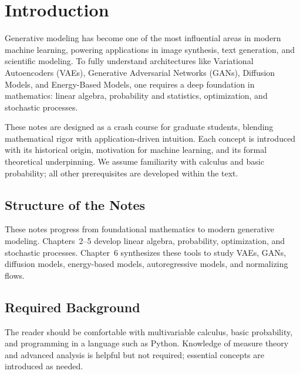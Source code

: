 \chapter{Introduction}\label{sec:intro}
Generative modeling has become one of the most influential areas in modern machine learning, powering applications in image synthesis, text generation, and scientific modeling. To fully understand architectures like Variational Autoencoders (VAEs), Generative Adversarial Networks (GANs), Diffusion Models, and Energy-Based Models, one requires a deep foundation in mathematics: linear algebra, probability and statistics, optimization, and stochastic processes.

These notes are designed as a crash course for graduate students, blending mathematical rigor with application-driven intuition. Each concept is introduced with its historical origin, motivation for machine learning, and its formal theoretical underpinning. We assume familiarity with calculus and basic probability; all other prerequisites are developed within the text.

\section{Structure of the Notes}
These notes progress from foundational mathematics to modern generative modeling. Chapters~2--5 develop linear algebra, probability, optimization, and stochastic processes. Chapter~6 synthesizes these tools to study VAEs, GANs, diffusion models, energy-based models, autoregressive models, and normalizing flows.

\section{Required Background}
The reader should be comfortable with multivariable calculus, basic probability, and programming in a language such as Python. Knowledge of measure theory and advanced analysis is helpful but not required; essential concepts are introduced as needed.

